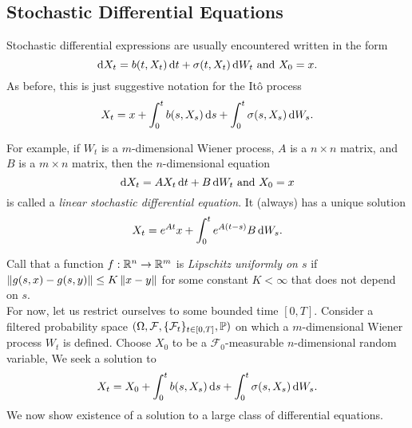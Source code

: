 \subsection{Stochastic Differential Equations}

Stochastic differential expressions are usually encountered written in the form
\[ \operatorname{d}\!{X}_t = b(t,X_t)\operatorname{d}\!{t} + \sigma(t,X_t)\operatorname{d}\!{W}_t \text{ and } X_0 = x. \]
As before, this is just suggestive notation for the It\^{o} process
\begin{equation*}
	X_t = x + \int_0^t b(s,X_s) \operatorname{d}\!{s} + \int_0^t \sigma(s,X_s)\operatorname{d}\!{W}_s.
\end{equation*}

For example, if $W_t$ is a $m$-dimensional Wiener process, $A$ is a $n\times n$ matrix, and $B$ is a $m\times n$ matrix, then the $n$-dimensional equation
\[ \operatorname{d}\!{X}_t = AX_t\operatorname{d}\!{t} + B\operatorname{d}\!{W}_t \text{ and } X_0 = x \]
is called a \textit{linear stochastic differential equation}. It (always) has a unique solution
\[ X_t = e^{At}x + \int_0^t e^{A(t-s)}B\operatorname{d}\!{W}_s. \]

Call that a function $f:\mathbb{R}^n\to\mathbb{R}^m$ is \textit{Lipschitz uniformly on $s$} if $\left\lVert g(s,x)-g(s,y)\right\rVert \leq K\left\lVert x-y\right\rVert$ for some constant $K<\infty$ that does not depend on $s$.\\
For now, let us restrict ourselves to some bounded time $[0,T]$. Consider a filtered probability space $(\Omega,\mathcal{F},\{\mathcal{F}_t\}_{t\in[0,T]},\mathbb{P})$ on which a $m$-dimensional Wiener process $W_t$ is defined. Choose $X_0$ to be a $\mathcal{F}_0$-measurable $n$-dimensional random variable, We seek a solution to
\begin{equation}
	\label{eqn: stochastic diff eqn}
	X_t = X_0 + \int_0^t b(s,X_s)\operatorname{d}\!{s} + \int_0^t \sigma(s,X_s)\operatorname{d}\!{W}_s.
\end{equation}
We now show existence of a solution to a large class of differential equations.

